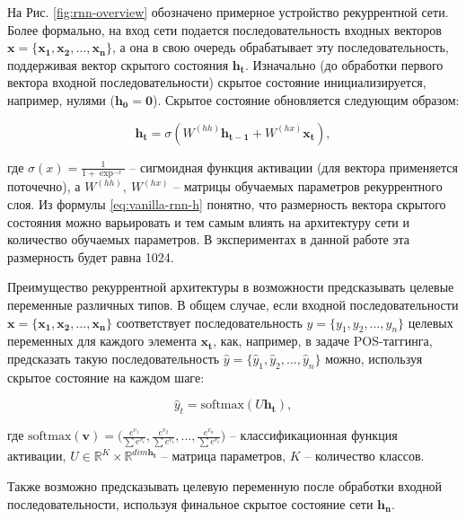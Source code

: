 \documentclass[12pt,a4paper]{amsart}
\begin{document}
На Рис. \ref{fig:rnn-overview} обозначено примерное устройство рекуррентной сети. Более формально, на вход сети подается последовательность входных векторов $\mathbf{x} = \lbrace \mathbf{x_1}, \mathbf{x_2}, \dots, \mathbf{x_n}\rbrace$, а она в свою очередь обрабатывает эту последовательность, поддерживая вектор скрытого состояния $\mathbf{h_t}$. Изначально (до обработки первого вектора входной последовательности) скрытое состояние инициализируется, например, нулями ($\mathbf{h_0} = \mathbf{0}$). Скрытое состояние обновляется следующим образом:

\begin{equation} \label{eq:vanilla-rnn-h}
\mathbf{h_t} = \sigma (W^{(hh)}\mathbf{h_{t-1}}+W^{(hx)}\mathbf{x_t}),
\end{equation}

где $\sigma(x) = \frac{1}{1+\exp^{-x}}$ -- сигмоидная функция активации (для вектора применяется поточечно), а $W^{(hh)},~W^{(hx)}$ -- матрицы обучаемых параметров рекуррентного слоя. Из формулы \eqref{eq:vanilla-rnn-h} понятно, что размерность вектора скрытого состояния можно варьировать и тем самым влиять на архитектуру сети и количество обучаемых параметров. В экспериментах в данной работе эта размерность будет равна 1024.

Преимущество рекуррентной архитектуры в возможности предсказывать целевые переменные различных типов. В общем случае, если входной последовательности $\mathbf{x} = \lbrace \mathbf{x_1}, \mathbf{x_2}, \dots, \mathbf{x_n}\rbrace$ соответствует последовательность $y = \lbrace y_1, y_2, \dots, y_n\rbrace$ целевых переменных для каждого элемента $\mathbf{x_t}$, как, например, в задаче POS-таггинга, предсказать такую последовательность $\hat{y} = \lbrace \hat{y}_1, \hat{y}_2, \dots, \hat{y}_n\rbrace$ можно, используя скрытое состояние на каждом шаге:

\begin{equation} \label{eq:vanilla-rnn-yhat}
\hat{y}_t = \text{softmax}(U\mathbf{h_t}),
\end{equation}

где $\text{softmax}(\mathbf{v}) = \big(\frac{e^{v_1}}{\sum e^{v_i}}, \frac{e^{v_2}}{\sum e^{v_i}}, \dots, \frac{e^{v_n}}{\sum e^{v_i}}\big)$ -- классификационная функция активации, $U \in \mathbb{R}^K \times \mathbb{R}^{dim\mathbf{h_t}}$ -- матрица параметров, $K$ -- количество классов.

Также возможно предсказывать целевую переменную после обработки входной последовательности, используя финальное скрытое состояние сети $\mathbf{h_n}$.
\end{document}
